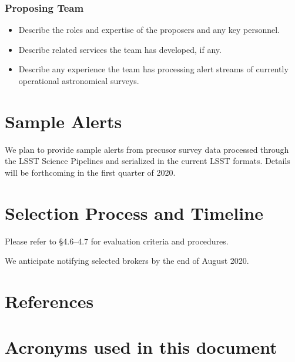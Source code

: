 \documentclass[DM,toc,lsstdraft]{lsstdoc}
\begin{document}
\subsubsection{Proposing Team}

\begin{itemize}
\item Describe the roles and expertise of the proposers and any key personnel.
\item Describe related services the team has developed, if any.
\item Describe any experience the team has processing alert streams of currently operational astronomical surveys. 
\end{itemize}


\section{Sample Alerts}

We plan to provide sample alerts from precusor survey data processed through the LSST Science Pipelines and serialized in the current LSST formats.
Details will be forthcoming in the first quarter of 2020.

\section{Selection Process and Timeline}

Please refer to  \S4.6--4.7 for evaluation criteria and procedures.

We anticipate notifying selected brokers by the end of August 2020.

\section{References} \label{sec:bib}

\renewcommand{\refname}{}


\section{Acronyms used in this document}\label{sec:acronyms}

\end{document}
